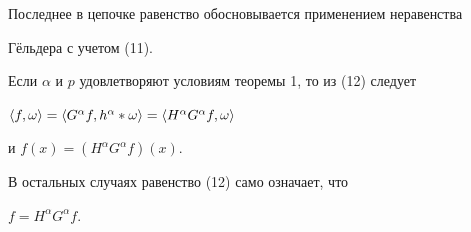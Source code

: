 \begin{pf}
Последнее в цепочке равенство обосновывается применением неравенства


Г\"ельдера с учетом (11).





Если $\alpha$ и $p$ удовлетворяют условиям теоремы 1, то из (12) следует


$\la f,\omega\ra=\la G^\alpha f,h^\alpha *\omega\ra=


\la H^\alpha G^\alpha f,\omega\ra$


и $f(x)=(H^\alpha G^\alpha f)(x)$.





В остальных случаях равенство (12) само означает, что


$f=H^\alpha G^\alpha f$.


\end{pf}








